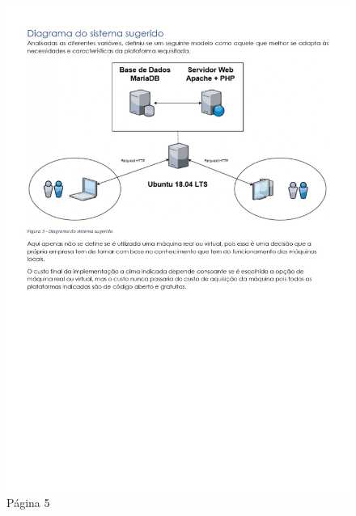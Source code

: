 \begin{figure}[H]
	\centering
	\includegraphics[width=\linewidth, frame]{figuras/Alternativas/pag5.jpg}
	\caption{Página 5}
	\label{fig:anexo_a_5}
\end{figure}
\newpage
